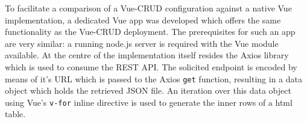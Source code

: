 \documentclass{juliacon}
\begin{document}
To facilitate a comparison of a Vue-CRUD configuration against a native Vue implementation, a dedicated Vue app was developed which offers the same functionality as the Vue-CRUD deployment. The prerequisites for such an app are very similar: a running node.js server is required with the Vue module available. At the centre of the implementation itself resides the Axios \cite{axios} library which is used to consume the REST API. The solicited endpoint is encoded by means of it's URL which is passed to the Axios \texttt{get} function, resulting in a data object which holds the retrieved JSON file. An iteration over this data object using Vue's \texttt{v-for} inline directive is used to generate the inner rows of a html table.\vskip 6pt


\end{document}
